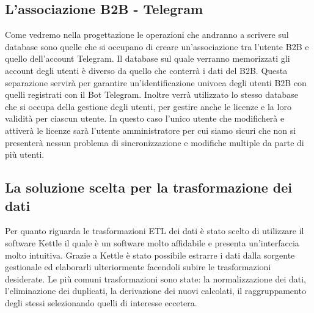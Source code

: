 \subsection{L'associazione B2B - Telegram}
Come vedremo nella progettazione le operazioni che andranno a scrivere sul database sono quelle che si occupano di creare un'associazione tra l'utente B2B e quello dell'account Telegram. Il database sul quale verranno memorizzati gli account degli utenti è diverso da quello che conterrà i dati del B2B. Questa separazione servirà per garantire un'identificazione univoca degli utenti B2B con quelli registrati con il Bot Telegram. Inoltre verrà utilizzato lo stesso database che si occupa della gestione degli utenti, per gestire anche le licenze e la loro validità per ciascun utente. In questo caso l'unico utente che modificherà e attiverà le licenze sarà l'utente amministratore per cui siamo sicuri che non si presenterà nessun problema di sincronizzazione e modifiche multiple da parte di più utenti. 

\subsection{La  soluzione scelta per la trasformazione dei dati}

Per quanto riguarda le trasformazioni ETL dei dati è stato scelto di utilizzare il software Kettle il quale è un software molto affidabile e presenta un'interfaccia molto intuitiva. Grazie a Kettle è stato possibile estrarre i dati dalla sorgente gestionale ed elaborarli ulteriormente facendoli subire le trasformazioni desiderate. Le più comuni trasformazioni sono state: la normalizzazione dei dati, l'eliminazione dei duplicati, la derivazione dei nuovi calcolati, il raggruppamento degli stessi selezionando quelli di interesse eccetera. \\
































